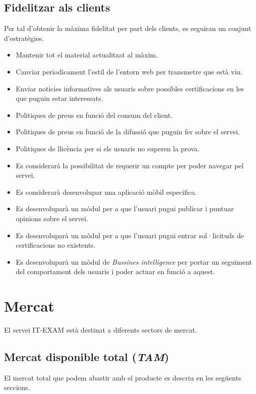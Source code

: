 \documentclass[12pt]{article}
\begin{document}
\subsection{Fidelitzar als clients}
Per tal d'obtenir la màxima fidelitat per part dels clients, es seguiran un conjunt d'estratègies.
\begin{itemize}
	\item Mantenir tot el material actualitzat al màxim.
	\item Canviar periodicament l'estil de l'entorn web per transmetre que està viu.
	\item Enviar noticies informatives als usuaris sobre possibles certificacions en les que puguin estar interessats.
	\item Politiques de preus en funció del consum del client.
	\item Politiques de preus en funció de la difussió que puguin fer sobre el servei.
	\item Politiques de llicència per si els usuaris no superen la prova.
	\item Es considerarà la possibilitat de requerir un compte per poder navegar pel servei.
	\item Es considerarà desenvolupar una aplicació mòbil especifica.
	\item Es desenvoluparà un mòdul per a que l'usuari pugui publicar i puntuar opinions sobre el servei.
	\item Es desenvoluparà un mòdul per a que l'usuari pugui entrar sol·licituds de certificacions no existents.
	\item Es desenvoluparà un mòdul de \textit{Bussines intelligence} per portar un seguiment del comportament dels usuaris i poder actuar en funció a aquest.
\end{itemize}

\clearpage
\section{Mercat}
El servei IT-EXAM està destinat a diferents sectors de mercat.
\subsection{Mercat disponible total (\textit{TAM})}
El mercat total que podem abastir amb el producte es descriu en les següents seccions.
\end{document}
